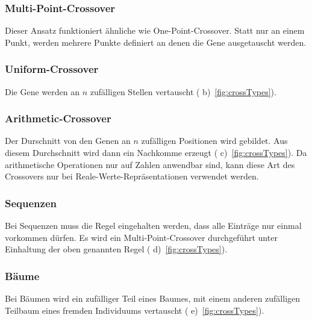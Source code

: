       \subsubsection{Multi-Point-Crossover}

        Dieser Ansatz funktioniert ähnliche wie One-Point-Crossover.
        Statt nur an einem Punkt, werden mehrere Punkte definiert an denen die Gene ausgetauscht werden.

      \subsubsection{Uniform-Crossover}

        Die Gene werden an \(n\) zufälligen Stellen vertauscht ( b)~\vref{fig:crossTypes}).

      \subsubsection{Arithmetic-Crossover}

        Der Durschnitt von den Genen an \(n\) zufälligen Positionen wird gebildet.
        Aus diesem Durchschnitt wird dann ein Nachkomme erzeugt ( c)~\vref{fig:crossTypes}).
        Da arithmetische Operationen nur auf Zahlen anwendbar sind,
        kann diese Art des Crossovers nur bei Reale-Werte-Repräsentationen verwendet werden.

      \subsubsection{Sequenzen}

        Bei Sequenzen muss die Regel eingehalten werden, dass alle Einträge nur einmal vorkommen dürfen.
        Es wird ein Multi-Point-Crossover durchgeführt unter Einhaltung der oben genannten Regel ( d)~\vref{fig:crossTypes}).

      \subsubsection{Bäume}

        Bei Bäumen wird ein zufälliger Teil eines Baumes,
        mit einem anderen zufälligen Teilbaum eines fremden Individuums vertauscht ( e)~\vref{fig:crossTypes}).

